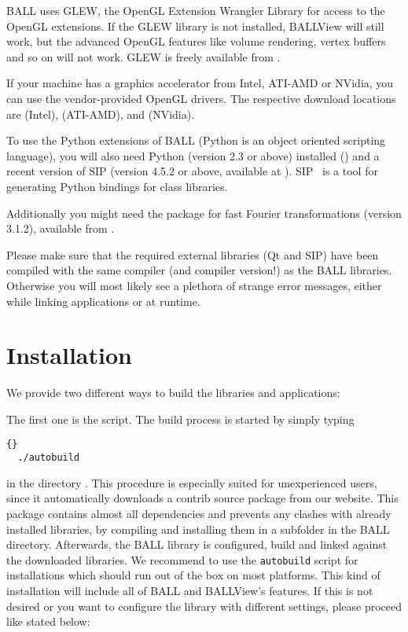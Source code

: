 BALL uses GLEW, the OpenGL Extension Wrangler Library for access to the OpenGL
extensions. If the GLEW library is not installed, BALLView will still work, but
the advanced OpenGL features like volume rendering, vertex buffers and so on
will not work. GLEW is freely available from .

If your machine has a graphics accelerator from Intel, ATI-AMD or NVidia, you
can use the vendor-provided OpenGL drivers. The respective download locations
are  (Intel),
 (ATI-AMD), and
 (NVidia).

To use the Python extensions of BALL (Python is an object oriented scripting
language),  you will also need Python (version 2.3 or above) 
installed () and a recent version of SIP (version 
4.5.2 or above, available at ).
SIP~\cite{SIP}  is a tool for generating Python bindings for \CPP 
class libraries.

Additionally you might need the  \cite{FFTW} package for fast 
Fourier transformations (version 3.1.2), available from 
.

Please make sure that the required external \CPP libraries (\ie Qt and SIP)
have been compiled with the same compiler (and compiler version!) as the BALL
libraries. Otherwise you will most likely see a plethora of strange error
messages, either while linking applications or at runtime.


\section{Installation}
\label{section:building-ball}

We provide two different ways to build the libraries and applications:

The first one is the  script. The build process is started by 
simply typing

\begin{lstlisting}{}
  ./autobuild
\end{lstlisting}

\noindent in the directory .  
This procedure is especially suited for unexperienced users, since it 
automatically downloads a contrib source package from our website. This 
package contains almost all dependencies and prevents any clashes with already 
installed libraries, by compiling and installing them in a subfolder in the 
BALL directory. Afterwards, the BALL library is configured, build and linked 
against the downloaded libraries. We recommend to use the {\tt autobuild} 
script for installations which should run out of the box on most platforms. 
This kind of installation will include all of
BALL and \mbox{BALLView's} features. If this is not desired or you want to 
configure the library with different settings, please proceed like stated below:

